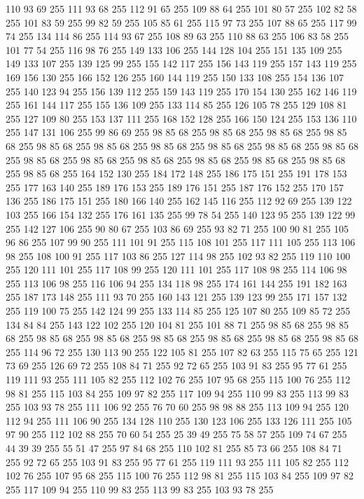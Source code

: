 110 93 69 255 111 93 68 255 112 91 65 255 109 88 64 255 101 80 57 255 102 82 58 255 101 83 59 255 99 82 59 255 105 85 61 255 115 97 73 255 107 88 65 255 117 99 74 255 134 114 86 255 114 93 67 255 108 89 63 255 110 88 63 255 106 83 58 255 101 77 54 255 116 98 76 255 149 133 106 255 144 128 104 255 151 135 109 255 149 133 107 255 139 125 99 255 155 142 117 255 156 143 119 255 157 143 119 255 169 156 130 255 166 152 126 255 160 144 119 255 150 133 108 255 154 136 107 255 140 123 94 255 156 139 112 255 159 143 119 255 170 154 130 255 162 146 119 255 161 144 117 255 155 136 109 255 133 114 85 255 126 105 78 255 129 108 81 255 127 109 80 255 153 137 111 255 168 152 128 255 166 150 124 255 153 136 110 255 147 131 106 255 99 86 69 255 98 85 68 255 98 85 68 255 98 85 68 255 98 85 68 255 98 85 68 255 98 85 68 255 98 85 68 255 98 85 68 255 98 85 68 255 98 85 68 255 98 85 68 255 98 85 68 255 98 85 68 255 98 85 68 255 98 85 68 255
98 85 68 255 98 85 68 255 164 152 130 255 184 172 148 255 186 175 151 255 191 178 153 255 177 163 140 255 189 176 153 255 189 176 151 255 187 176 152 255 170 157 136 255 186 175 151 255 180 166 140 255 162 145 116 255 112 92 69 255 139 122 103 255 166 154 132 255 176 161 135 255 99 78 54 255 140 123 95 255 139 122 99 255 142 127 106 255 90 80 67 255 103 86 69 255 93 82 71 255 100 90 81 255 105 96 86 255 107 99 90 255 111 101 91 255 115 108 101 255 117 111 105 255 113 106 98 255 108 100 91 255 117 103 86 255 127 114 98 255 102 93 82 255 119 110 100 255 120 111 101 255 117 108 99 255 120 111 101 255 117 108 98 255 114 106 98 255 113 106 98 255 116 106 94 255 134 118 98 255 174 161 144 255 191 182 163 255 187 173 148 255 111 93 70 255 160 143 121 255 139 123 99 255 171 157 132 255 119 100 75 255 142 124 99 255 133 114 85 255 125 107 80 255 109 85 72 255 134 84 84 255 143 122 102 255 120 104 81 255 101 88 71 255 98 85 68 255 98 85 68 255 98 85 68 255
98 85 68 255 98 85 68 255 98 85 68 255 98 85 68 255 98 85 68 255 114 96 72 255 130 113 90 255 122 105 81 255 107 82 63 255 115 75 65 255 121 73 69 255 126 69 72 255 108 84 71 255 92 72 65 255 103 91 83 255 95 77 61 255 119 111 93 255 111 105 82 255 112 102 76 255 107 95 68 255 115 100 76 255 112 98 81 255 115 103 84 255 109 97 82 255 117 109 94 255 110 99 83 255 113 99 83 255 103 93 78 255 111 106 92 255 76 70 60 255 98 98 88 255 113 109 94 255 120 112 94 255 111 106 90 255 134 128 110 255 130 123 106 255 133 126 111 255 105 97 90 255 112 102 88 255 70 60 54 255 25 39 49 255 75 58 57 255 109 74 67 255 44 39 39 255 55 51 47 255 97 84 68 255 110 102 81 255 85 73 66 255 108 84 71 255 92 72 65 255 103 91 83 255 95 77 61 255 119 111 93 255 111 105 82 255 112 102 76 255 107 95 68 255 115 100 76 255 112 98 81 255 115 103 84 255 109 97 82 255 117 109 94 255 110 99 83 255 113 99 83 255 103 93 78 255
